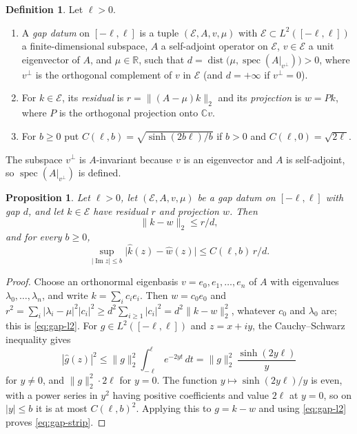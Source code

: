 \documentclass[11pt]{amsart}
\theoremstyle{plain}
\newtheorem{proposition}[theorem]{Proposition}
\theoremstyle{definition}
\newtheorem{definition}[theorem]{Definition}
\theoremstyle{remark}
\numberwithin{equation}{section}
\newcommand{\C}{\mathbb{C}}
\newcommand{\R}{\mathbb{R}}
\DeclareMathOperator{\spec}{spec}
\DeclareMathOperator{\Ima}{Im}
\renewcommand{\Im}{\Ima}
\begin{document}
\begin{definition}\label{def:residual-gap}
Let $\ell>0$.
\begin{enumerate}[label=(\alph*)]
\item A \emph{gap datum} on $[-\ell,\ell]$ is a tuple
  $(\mathcal E,A,v,\mu)$ with $\mathcal E\subset L^2([-\ell,\ell])$ a
  finite-dimensional subspace, $A$ a self-adjoint operator on
  $\mathcal E$, $v\in\mathcal E$ a unit eigenvector of $A$, and
  $\mu\in\R$, such that
  $d=\operatorname{dist}\bigl(\mu,\spec(A|_{v^\perp})\bigr)>0$, where
  $v^\perp$ is the orthogonal complement of $v$ in $\mathcal E$ (and
  $d=+\infty$ if $v^\perp=0$).
\item For $k\in\mathcal E$, its \emph{residual} is
  $r=\|(A-\mu)k\|_2$ and its \emph{projection} is $w=Pk$, where $P$ is
  the orthogonal projection onto $\C v$.
\item For $b\ge0$ put $C(\ell,b)=\sqrt{\sinh(2b\ell)/b}$ if $b>0$ and
  $C(\ell,0)=\sqrt{2\ell}$.
\end{enumerate}
\end{definition}

The subspace $v^\perp$ is $A$-invariant because $v$ is an eigenvector
and $A$ is self-adjoint, so $\spec(A|_{v^\perp})$ is defined.

\begin{proposition}\label{prop:gap}
Let $\ell>0$, let $(\mathcal E,A,v,\mu)$ be a gap datum on
$[-\ell,\ell]$ with gap $d$, and let $k\in\mathcal E$ have residual $r$
and projection $w$. Then
\begin{equation}\label{eq:gap-l2}
\|k-w\|_2\le r/d,
\end{equation}
and for every $b\ge0$,
\begin{equation}\label{eq:gap-strip}
\sup_{|\Im z|\le b}\bigl|\widehat k(z)-\widehat w(z)\bigr|
\le C(\ell,b)\,r/d .
\end{equation}
\end{proposition}

\begin{proof}
Choose an orthonormal eigenbasis $v=e_0,e_1,\dots,e_n$ of $A$ with
eigenvalues $\lambda_0,\dots,\lambda_n$, and write
$k=\sum_ic_ie_i$. Then $w=c_0e_0$ and
$r^2=\sum_i|\lambda_i-\mu|^2|c_i|^2\ge d^2\sum_{i\ge1}|c_i|^2
=d^2\|k-w\|_2^2$, whatever $c_0$ and $\lambda_0$ are; this is
\eqref{eq:gap-l2}. For $g\in L^2([-\ell,\ell])$ and $z=x+iy$, the
Cauchy--Schwarz inequality gives
\[
|\widehat g(z)|^2\le\|g\|_2^2\int_{-\ell}^{\ell}e^{-2yt}\,dt
=\|g\|_2^2\,\frac{\sinh(2y\ell)}{y}
\]
for $y\ne0$, and $\|g\|_2^2\cdot2\ell$ for $y=0$. The function
$y\mapsto\sinh(2y\ell)/y$ is even, with a power series in $y^2$ having
positive coefficients and value $2\ell$ at $y=0$, so on $|y|\le b$ it is
at most $C(\ell,b)^2$. Applying this to $g=k-w$ and using
\eqref{eq:gap-l2} proves \eqref{eq:gap-strip}.
\end{proof}
\end{document}
